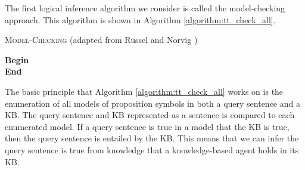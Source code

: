 The first logical inference algorithm we consider is called the model-checking approach. This algorithm is shown in Algorithm \ref{algorithm:tt_check_all}.

\vspace{0.2cm}
\begin{algorithm}[H]
\label{algorithm:tt_check_all}
\caption{\textsc{Model-Checking} (adapted from Russel and Norvig \citep{russell2016artificial})}
\SetAlgoLined
\DontPrintSemicolon
{}
\textbf{Begin} \\
\Indm 
\textbf{End} 
\end{algorithm}
\vspace{0.5cm}


The basic principle that Algorithm \ref{algorithm:tt_check_all} works on is the enumeration of all models of proposition symbols in both a query sentence and a KB. The query sentence and KB represented as a sentence is compared to each enumerated model. If a query sentence is true in a model that the KB is true, then the query sentence is entailed by the KB. This means that we can infer the query sentence is true from knowledge that a knowledge-based agent holds in its KB.

